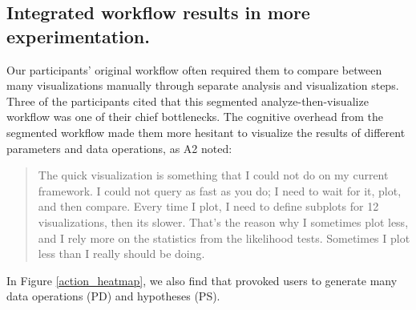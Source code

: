 \subsection{Integrated workflow results in more experimentation.}
\par Our participants' original workflow often required them to compare between many visualizations manually through separate analysis and visualization steps. Three of the participants cited that this segmented analyze-then-visualize workflow was one of their chief bottlenecks. The cognitive overhead from the segmented workflow made them more hesitant to visualize the results of different parameters and data operations, as A2 noted:
\begin{quote}
The quick visualization is something that I could not do on my current framework. I could not query as fast as you do; I need to wait for it, plot, and then compare. Every time I plot, I need to define subplots for 12 visualizations, then its slower. That's the reason why I sometimes plot less, and I rely more on the statistics from the likelihood tests. Sometimes I plot less than I really should be doing.
\end{quote}
In Figure \ref{action_heatmap}, we also find that \zv provoked users to generate many data operations (PD) and hypotheses (PS).
